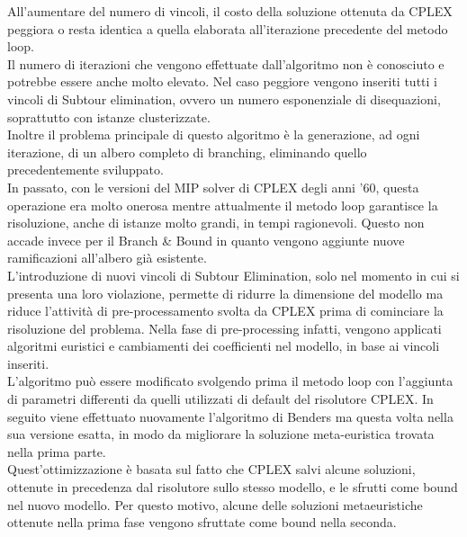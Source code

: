 \vspace{10cm}
All'aumentare del numero di vincoli, il costo della soluzione ottenuta da CPLEX peggiora o resta identica a quella elaborata all'iterazione precedente del metodo loop.\\
Il numero di iterazioni che vengono effettuate dall'algoritmo non è conosciuto e potrebbe essere anche molto elevato. Nel caso peggiore vengono inseriti tutti i vincoli di Subtour elimination, ovvero un numero esponenziale di disequazioni, soprattutto con istanze clusterizzate.\\
Inoltre il problema principale di questo algoritmo è la generazione, ad ogni iterazione, di un albero completo di branching, eliminando quello precedentemente sviluppato.\\
In passato, con le versioni del MIP solver di CPLEX degli anni '60, questa operazione era molto onerosa mentre attualmente il metodo loop garantisce la risoluzione, anche di istanze molto grandi, in tempi ragionevoli.
Questo non accade invece per il Branch \& Bound in quanto vengono aggiunte nuove ramificazioni all'albero già esistente.\\
L'introduzione di nuovi vincoli di Subtour Elimination, solo nel momento in cui si presenta una loro violazione, permette di ridurre la dimensione del modello ma riduce l'attività di pre-processamento svolta da CPLEX prima di cominciare la risoluzione del problema. Nella fase di pre-processing infatti, vengono applicati algoritmi euristici e cambiamenti dei coefficienti nel modello, in base ai vincoli inseriti.\\
L'algoritmo può essere modificato svolgendo prima il metodo loop con l'aggiunta di parametri differenti da quelli utilizzati di default del risolutore CPLEX. In seguito viene effettuato nuovamente l'algoritmo di Benders ma questa volta nella sua versione esatta, in modo da migliorare la soluzione meta-euristica trovata nella prima parte. \\
Quest'ottimizzazione è basata sul fatto che CPLEX salvi alcune soluzioni, ottenute in precedenza dal risolutore sullo stesso modello, e le sfrutti come bound nel nuovo modello. Per questo motivo, alcune delle soluzioni metaeuristiche ottenute nella prima fase vengono sfruttate come bound nella seconda.

